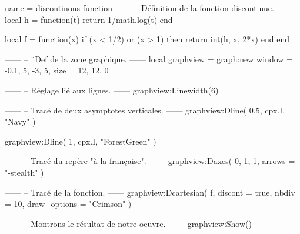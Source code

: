 \documentclass{standalone}
\begin{document}
\begin{luadraw}{name = discontinous-function}
------
-- Définition de la fonction discontinue.
------
local h = function(t)
  return 1/math.log(t)
end

local f = function(x)
  if (x < 1/2) or (x > 1) then
    return int(h, x, 2*x)
  end
end

------
-- ¨Def de la zone graphique.
------
local graphview = graph:new{
  window = {-0.1, 5, -3, 5},
  size   = {12, 12, 0}
}

------
-- Réglage lié aux lignes.
------
graphview:Linewidth(6)

------
-- Tracé de deux asymptotes verticales.
------
graphview:Dline(
  {0.5, cpx.I},
  "Navy"
)

graphview:Dline(
  {1, cpx.I},
  "ForestGreen"
)

------
-- Tracé du repère "à la française".
------
graphview:Daxes(
  {0, 1, 1},
  {arrows = "-stealth"}
)

------
-- Tracé de la fonction.
------
graphview:Dcartesian(
  f,
  {
    discont      = true,
    nbdiv        = 10,
    draw_options = "Crimson"
  }
)

------
-- Montrons le résultat de notre oeuvre.
------
graphview:Show()
\end{luadraw}
\end{document}
